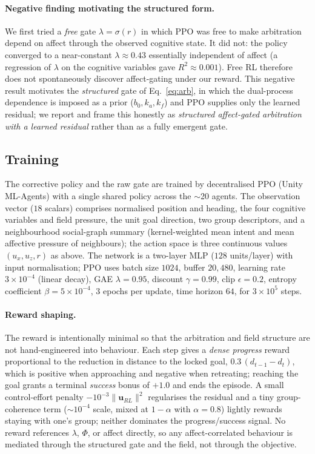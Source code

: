 \documentclass[sigconf,nonacm]{acmart}
\begin{document}
\paragraph{Negative finding motivating the structured form.} We first tried a \emph{free} gate $\lambda=\sigma(r)$ in which PPO was free to make arbitration depend on affect through the observed cognitive state. It did not: the policy converged to a near-constant $\lambda\approx0.43$ essentially independent of affect (a regression of $\lambda$ on the cognitive variables gave $R^2\approx0.001$). Free RL therefore does not spontaneously discover affect-gating under our reward. This negative result motivates the \emph{structured} gate of Eq.~\eqref{eq:arb}, in which the dual-process dependence is imposed as a prior ($b_0,k_a,k_f$) and PPO supplies only the learned residual; we report and frame this honestly as \emph{structured affect-gated arbitration with a learned residual} rather than as a fully emergent gate.

\subsection{Training}
\label{sub:train}
The corrective policy and the raw gate are trained by decentralised PPO (Unity ML-Agents) with a single shared policy across the $\sim$20 agents. The observation vector ($18$ scalars) comprises normalised position and heading, the four cognitive variables and field pressure, the unit goal direction, two group descriptors, and a neighbourhood social-graph summary (kernel-weighted mean intent and mean affective pressure of neighbours); the action space is three continuous values $(u_x,u_z,r)$ as above. The network is a two-layer MLP ($128$ units/layer) with input normalisation; PPO uses batch size $1024$, buffer $20{,}480$, learning rate $3\!\times\!10^{-4}$ (linear decay), GAE $\lambda=0.95$, discount $\gamma=0.99$, clip $\epsilon=0.2$, entropy coefficient $\beta=5\!\times\!10^{-4}$, $3$ epochs per update, time horizon $64$, for $3\!\times\!10^{5}$ steps.

\paragraph{Reward shaping.} The reward is intentionally minimal so that the arbitration and field structure are not hand-engineered into behaviour. Each step gives a \emph{dense progress} reward proportional to the reduction in distance to the locked goal, $0.3\,(d_{t-1}-d_t)$, which is positive when approaching and negative when retreating; reaching the goal grants a terminal \emph{success} bonus of $+1.0$ and ends the episode. A small control-effort penalty $-10^{-3}\|\mathbf{u}_{RL}\|^2$ regularises the residual and a tiny group-coherence term ($\sim\!10^{-4}$ scale, mixed at $1-\alpha$ with $\alpha=0.8$) lightly rewards staying with one's group; neither dominates the progress/success signal. No reward references $\lambda$, $\Phi$, or affect directly, so any affect-correlated behaviour is mediated through the structured gate and the field, not through the objective.
\end{document}
